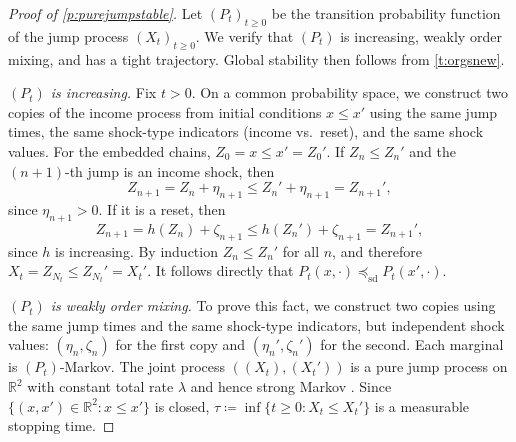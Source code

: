 \documentclass[12pt,reqno]{amsart}
\numberwithin{equation}{section}
\theoremstyle{definition}
\newcommand{\1}{\mathbbm{1}}
\newcommand{\RR}{\mathbb{R}}
\newcommand{\lam}{\lambda}
\newcommand{\precsd}{\preceq_{\textrm{sd}}}
\begin{document}
\begin{proof}[Proof of \cref{p:purejumpstable}]
    Let $(P_t)_{t \geq 0}$ be the transition probability function of the jump
    process $(X_t)_{t \geq 0}$. We
    verify that $(P_t)$ is increasing, weakly order mixing, and has a tight
    trajectory. Global stability then follows from \cref{t:orgsnew}.

    \textit{$(P_t)$ is increasing.}  Fix $t > 0$. On a common probability space,
    we construct two copies of the income process from initial conditions $x
    \leq x'$ using the same jump times, the same shock-type indicators (income
    vs.\ reset), and the same shock values.  For the embedded chains, $Z_0 = x
    \leq x' = Z_0'$. If $Z_n \leq Z_n'$ and the $(n+1)$-th jump is an income
    shock, then
    \begin{equation*}
        Z_{n+1} = Z_n + \eta_{n+1} \leq Z_n' + \eta_{n+1} = Z_{n+1}',
    \end{equation*}
    since $\eta_{n+1} > 0$.  If it is a reset, then
    \begin{equation*}
        Z_{n+1} = h(Z_n) + \zeta_{n+1} \leq h(Z_n') + \zeta_{n+1} = Z_{n+1}',
    \end{equation*}
    since $h$ is increasing.  By induction $Z_n \leq Z_n'$ for all $n$, and
    therefore $X_t = Z_{N_t} \leq Z_{N_t}' = X_t'$.
    It follows directly that $P_t(x, \cdot) \precsd P_t(x', \cdot)$.

    \textit{$(P_t)$ is weakly order mixing.}  To prove this fact, we construct two copies using the
    same jump times and the same shock-type indicators, but independent shock
    values: $(\eta_n, \zeta_n)$ for the first copy and $(\eta_n', \zeta_n')$ for
    the second.  Each marginal is $(P_t)$-Markov.  The joint process $((X_t),
    (X_t'))$ is a pure jump process on $\RR^2$ with constant total rate $\lam$
    and hence strong Markov
    \citep[Theorem~2.4]{rudnicki2017piecewise}.  Since $\{(x, x') \in \RR^2 : x
    \leq x'\}$ is closed, $\tau \coloneq \inf\{t \geq 0 : X_t \leq X_t'\}$ is
    a measurable stopping time.


\end{proof}
\end{document}
